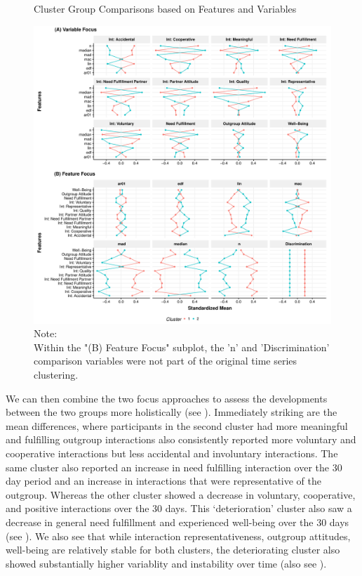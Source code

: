\begin{figure}[!ht] %
  \caption{Cluster Group Comparisons based on Features and Variables}
  \label{fig:clusterFeatVar}
  \centering\includegraphics[width=\textwidth]{figures/clusterFeatVarComb.pdf}
  \caption*{Note: \\
  Within the "(B) Feature Focus" subplot, the 'n' and 'Discrimination' comparison variables were not part of the original time series clustering.}
\end{figure}

We can then combine the two focus approaches to assess the developments
between the two groups more holistically (see ).
Immediately striking are the mean differences, where participants in the
second cluster had more meaningful and fulfilling outgroup interactions
also consistently reported more voluntary and cooperative interactions
but less accidental and involuntary interactions. The same cluster also
reported an increase in need fulfilling interaction over the 30 day
period and an increase in interactions that were representative of the
outgroup. Whereas the other cluster showed a decrease in voluntary,
cooperative, and positive interactions over the 30 days. This
`deterioration' cluster also saw a decrease in general need fulfillment
and experienced well-being over the 30 days (see
). We also see that while interaction
representativeness, outgroup attitudes, well-being are relatively stable
for both clusters, the deteriorating cluster also showed substantially
higher variablity and instability over time (also see
).

